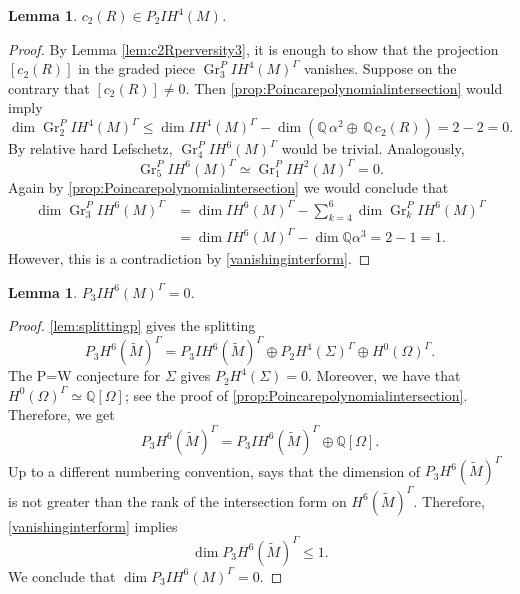 \documentclass[JEP,XML,SOM,Unicode, NoEqCountersInSection,NoFloatCountersInSection,published]{cedram}
\newcommand{\IH}{\mathit{IH}}
\newtheorem{lem}[thm]{Lemma}
\theoremstyle{definition}
\newcommand{\QQ}{\mathbb{Q}}
\newcommand{\Gr}{\operatorname{Gr}}
\let\Runi R
\begin{document}
\begin{lem}\label{lem:c2perversity}
$c_2(\Runi) \in P_2 \IH^4(M)$.
\end{lem}
\begin{proof}
By Lemma \ref{lem:c2Rperversity3}, it is enough to show that the projection $[c_2(\Runi)]$ in the graded piece $\Gr^P_3\IH^4(M)^{\Gamma}$ vanishes. Suppose on the contrary that $[c_2(\Runi)]\neq 0$.
Then \cref{prop:Poincarepolynomialintersection} would imply
\[
\dim \Gr^P_2 \IH^4(M)^{\Gamma}\leq \dim \IH^4(M)^{\Gamma} - \dim (\QQ \,\alpha^2 \oplus \,\QQ \,c_2(\Runi)) =2-2=0.
\]
By relative hard Lefschetz, $\Gr^P_4 \IH^6(M)^{\Gamma}$ would be trivial. Analogously,
\[
\Gr^P_5 \IH^6(M)^{\Gamma}\simeq \Gr^P_1 \IH^2(M)^{\Gamma}=0.
\]
Again by \cref{prop:Poincarepolynomialintersection} we would conclude that
\begin{align*}
\dim \Gr^P_3\IH^6(M)^{\Gamma} & = \dim \IH^6(M)^{\Gamma} - \sum^6_{k=4}\dim \Gr^P_k\IH^6(M)^{\Gamma} \\
& = \dim \IH^6(M)^{\Gamma} - \dim \QQ\alpha^3 = 2-1= 1.
\end{align*}
However, this is a contradiction by \cref{vanishinginterform}.
\end{proof}

\begin{lem}\label{lem:c2perversityII}
$P_3 \IH^6(M)^{\Gamma}=0$.
\end{lem}

\begin{proof}
\cref{lem:splittingp} gives the splitting
\[
P_3 H^6(\widetilde{M})^{\Gamma} = P_3 \IH^6(\widetilde{M})^{\Gamma} \oplus P_2 H^4(\Sigma)^{\Gamma} \oplus H^0(\Omega)^{\Gamma}.
\]
The P=W conjecture for $\Sigma$ gives $P_2 H^4(\Sigma)=0$.
Moreover, we have that
$H^0(\Omega)^{\Gamma} \simeq \QQ [\Omega]$; see the proof of \cref{prop:Poincarepolynomialintersection}. Therefore, we get
\[
P_3 H^6(\widetilde{M})^{\Gamma} = P_3 \IH^6(\widetilde{M})^{\Gamma} \oplus \QQ [\Omega].
\]
Up to a different numbering convention, \cite[Th.\,2.1.10]{deCataldoMigliorini05} says that the dimension of $P_3 H^6(\widetilde{M})^{\Gamma}$ is not greater than the rank of the intersection form on $H^6(\widetilde{M})^{\Gamma}$. Therefore, \cref{vanishinginterform} implies
\[
\dim P_3 H^6(\widetilde{M})^{\Gamma}\leq 1.
\]
We conclude that $\dim P_3 \IH^6(M)^{\Gamma}=0$.
\end{proof}
\end{document}
